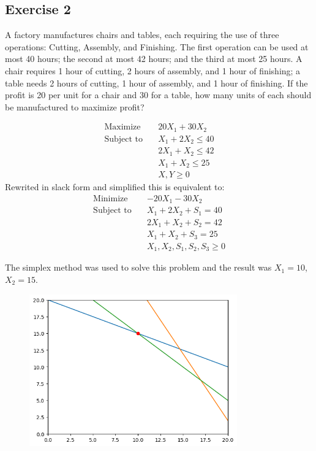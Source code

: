 \subsection{Exercise 2}
A factory manufactures chairs and tables, each requiring the use of three operations: Cutting, Assembly, and Finishing. The first operation can be used at most 40 hours; the second at most 42 hours; and the third at most 25 hours. A chair requires 1 hour of cutting, 2 hours of assembly, and 1 hour of finishing; a table needs 2 hours of cutting, 1 hour of assembly, and 1 hour of finishing. If the profit is 20 per unit for a chair and 30 for a table, how many units of each should be manufactured to maximize profit?

\begin{equation}
    \begin{aligned}
        \text{Maximize} \quad   & 20X_1 + 30X_2      \\
        \text{Subject to} \quad & X_1 + 2X_2 \leq 40 \\
                                & 2X_1 + X_2 \leq 42 \\
                                & X_1 + X_2 \leq 25  \\
                                & X, Y \geq 0
    \end{aligned}
\end{equation}
Rewrited in slack form and simplified this is equivalent to:
\begin{equation}
    \begin{aligned}
        \text{Minimize} \quad   & -20X_1 - 30X_2                 \\
        \text{Subject to} \quad & X_1 + 2X_2 + S_1 = 40          \\
                                & 2X_1 + X_2 + S_2 = 42          \\
                                & X_1 + X_2 + S_3 = 25           \\
                                & X_1, X_2, S_1, S_2, S_3 \geq 0
    \end{aligned}
\end{equation}

The simplex method was used to solve this problem and the result was $X_1 = 10$, $X_2 = 15$.
\begin{figure}
    \centering
    \includegraphics[width=0.8\textwidth]{lab10/imgs/ex2.png}
    \label{fig:lab10-ex2}
\end{figure}

